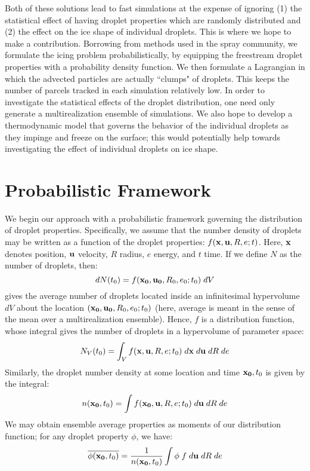 \documentclass{article}
\begin{document}
Both of these solutions lead to fast simulations at the expense of ignoring (1) the statistical effect of 
having droplet properties which are randomly distributed and (2) the effect on the ice shape of individual 
droplets. This is where we hope to make a contribution. Borrowing from methods used in the spray 
community, we formulate the icing problem probabilistically, by equipping the freestream droplet 
properties with a probability density function. We then formulate a Lagrangian in which the advected 
particles are actually ``clumps" of droplets. This keeps the number of parcels tracked in each simulation 
relatively low. In order to investigate the statistical effects of the droplet distribution, one need only generate 
a multirealization ensemble of simulations. We also hope to develop a thermodynamic model that governs the 
behavior of the individual droplets as they impinge and freeze on the surface; this would potentially help 
towards investigating the effect of individual droplets on ice shape.

\newpage
\section{Probabilistic Framework}
We begin our approach with a probabilistic framework governing the distribution of droplet properties. 
Specifically, we assume that the number density of droplets may be written as a function of the droplet 
properties: $f({\bf x}, {\bf u}, R, e; t)$. Here, ${\bf x}$ denotes position, ${\bf u}$ velocity, $R$ radius, $e$ 
energy, and $t$ time. If we define $N$ as the number of droplets, then:
\begin{equation}
\label{dN}
dN(t_0) = f({\bf x_0}, {\bf u_0}, R_0, e_0; t_0) \; dV
\end{equation}
gives the average number of droplets 
located inside an infinitesimal hypervolume $dV$ about the location $({\bf x_0}, {\bf u_0}, R_0, e_0; t_0)$ 
(here, average is meant in the sense of the mean over a multirealization ensemble). Hence, $f$ is a 
distribution function, whose integral gives the number of droplets in a hypervolume of parameter space:
\begin{equation}
N_{V}(t_0) = \int_{V} f({\bf x}, {\bf u}, R, e; t_0) \; d{\bf x} \; d{\bf u} \; dR \; de
\end{equation}
Similarly, the droplet number density at some location and time ${\bf x_0}, t_0$ is given by the integral:
\begin{equation}
n({\bf x_0}, t_0) = \int f({\bf x_0}, {\bf u}, R, e; t_0) \; d{\bf u} \; dR \; de
\end{equation}
We may obtain ensemble average properties as moments of our distribution function; for any droplet 
property $\phi$, we have:
\begin{equation}
\overline{\phi({\bf x_0},t_0)} = \frac{1}{n({\bf x_0}, t_0)} \int \phi \; f \; d{\bf u} \; dR \; de 
\end{equation}
\end{document}
